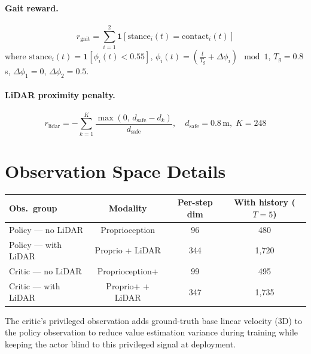 \documentclass{article}
\begin{document}
\paragraph{Gait reward.}
\[
  r_\text{gait} = \sum_{i=1}^{2} \mathbf{1}\!\left[\text{stance}_i(t) = \text{contact}_i(t)\right]
\]
where $\text{stance}_i(t) = \mathbf{1}[\phi_i(t) < 0.55]$,
$\phi_i(t) = \left(\frac{t}{T_g} + \Delta\phi_i\right) \!\mod 1$,
$T_g = 0.8$\,s, $\Delta\phi_1 = 0$, $\Delta\phi_2 = 0.5$.

\paragraph{LiDAR proximity penalty.}
\[
  r_\text{lidar} = -\sum_{k=1}^{K} \frac{\max(0,\, d_\text{safe} - d_k)}{d_\text{safe}},
  \quad d_\text{safe} = 0.8\,\text{m},\; K = 248
\]

\section{Observation Space Details}
\label{app:obs}

\begin{center}
\begin{tabular}{lccc}
  \toprule
  \textbf{Obs.\ group} & \textbf{Modality} & \textbf{Per-step dim}
    & \textbf{With history ($T{=}5$)} \\
  \midrule
  Policy — no LiDAR & Proprioception & 96 & 480 \\
  Policy — with LiDAR & Proprio + LiDAR & 344 & 1{,}720 \\
  Critic — no LiDAR & Proprioception+ & 99 & 495 \\
  Critic — with LiDAR & Proprio+ + LiDAR & 347 & 1{,}735 \\
  \bottomrule
\end{tabular}
\end{center}

The critic's privileged observation adds ground-truth base linear velocity (3D)
to the policy observation to reduce value estimation variance during training
while keeping the actor blind to this privileged signal at deployment.
\end{document}
